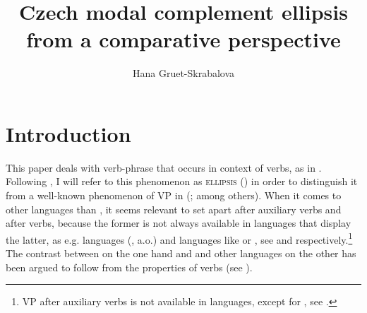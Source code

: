 \documentclass[output=paper,colorlinks,citecolor=brown,]{langsci/langscibook}
\title{Czech modal complement ellipsis from a comparative perspective}
\author{Hana Gruet-Skrabalova\affiliation{Université Clermont Auvergne, \\Laboratoire de recherche sur le langage}}
\begin{document}
\maketitle

\section{Introduction} \label{sec:1}
This paper deals with verb-phrase  that occurs in context of  verbs, as in . Following \cite{Aelbrecht2008}, I will refer to this phenomenon as \textsc{ ellipsis} () in order to distinguish it from a well-known phenomenon of VP  in  (\citealt{Ross1969,Sag1976,Merchant2001}; among others). When it comes to other languages than , it seems relevant to set apart  after auxiliary verbs and  after  verbs, because the former is not always available in languages that display the latter, as e.g.  languages (\citealt{busquets2001ellipse,Depiante2001,Dagnac2008,Dagnac2010}, a.o.) and  languages like  or  \citep{Lobeck1995,Aelbrecht2008}, see  and  respectively.\footnote{VP  after auxiliary verbs is not available in  languages, except for , see \cite{Cyrino-Matos2002}.} The contrast between  on the one hand and  and other  languages on the other has been argued to follow from the properties of  verbs (see  ).
\end{document}
